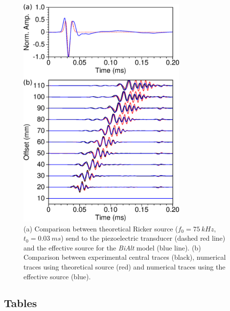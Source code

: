 \documentclass[manuscript,revised]{geophysics}
\newcommand{\bialt}{\textit{BiAlt} }
\begin{document}


\begin{figure}[!h]
	\centering
	\includegraphics[width=0.75\textwidth]{fig/panel_bialt_lswe.eps}
	\caption{(a) Comparison between theoretical Ricker source ($f_{0}=75\ kHz$, $t_{0}=0.03\ ms$) send to the piezoelectric transducer (dashed red line) and the effective source for the \bialt model (blue line). (b) Comparison between experimental central traces (black), numerical traces using theoretical source (red) and numerical traces using the effective source (blue). }
	\label{blind-test}
\end{figure}

\clearpage
\newpage

\subsection*{Tables}
\end{document}
